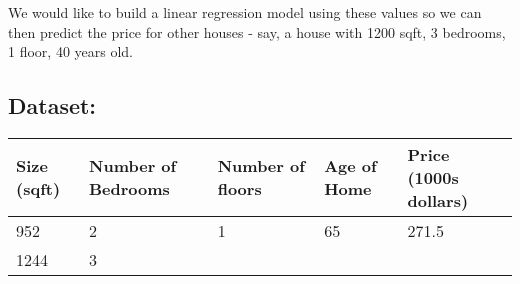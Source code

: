 \documentclass[11pt]{article}
\begin{document}
We would like to build a linear regression model using these values so
we can then predict the price for other houses - say, a house with 1200
sqft, 3 bedrooms, 1 floor, 40 years old.

\hypertarget{dataset}{%
\subsection{Dataset:}\label{dataset}}

\begin{longtable}[]{@{}lllll@{}}
\toprule
\begin{minipage}[b]{0.15\columnwidth}\raggedright
Size (sqft)\strut
\end{minipage} & \begin{minipage}[b]{0.18\columnwidth}\raggedright
Number of Bedrooms\strut
\end{minipage} & \begin{minipage}[b]{0.16\columnwidth}\raggedright
Number of floors\strut
\end{minipage} & \begin{minipage}[b]{0.14\columnwidth}\raggedright
Age of Home\strut
\end{minipage} & \begin{minipage}[b]{0.22\columnwidth}\raggedright
Price (1000s dollars)\strut
\end{minipage}\tabularnewline
\midrule
\endhead
\begin{minipage}[t]{0.15\columnwidth}\raggedright
952\strut
\end{minipage} & \begin{minipage}[t]{0.18\columnwidth}\raggedright
2\strut
\end{minipage} & \begin{minipage}[t]{0.16\columnwidth}\raggedright
1\strut
\end{minipage} & \begin{minipage}[t]{0.14\columnwidth}\raggedright
65\strut
\end{minipage} & \begin{minipage}[t]{0.22\columnwidth}\raggedright
271.5\strut
\end{minipage}\tabularnewline
\begin{minipage}[t]{0.15\columnwidth}\raggedright
1244\strut
\end{minipage} & \begin{minipage}[t]{0.18\columnwidth}\raggedright
3\strut
\end{minipage} & \begin{minipage}[t]{0.16\columnwidth}\raggedright

\end{minipage}
\end{longtable}
\end{document}
